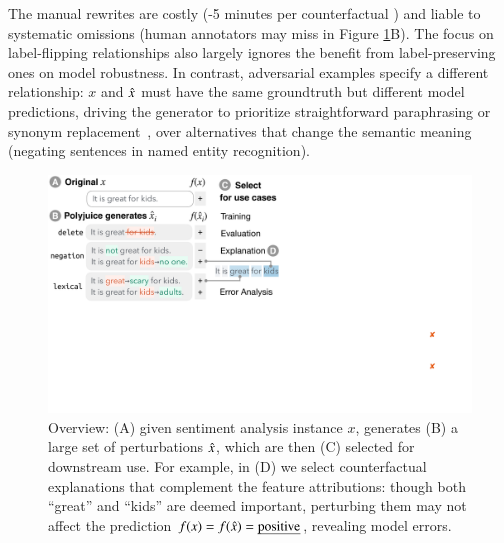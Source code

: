 The manual rewrites are costly (-5 minutes per counterfactual \cite{kaushik2019learning}) and liable to systematic omissions (\eg human annotators may miss  in Figure \ref{fig:teaser}B).
The focus on label-flipping relationships also largely ignores the benefit from label-preserving ones on model robustness.
In contrast, adversarial examples specify a different relationship: $x$ and $\hat{x}$ must have the same groundtruth but different model predictions, driving the generator to prioritize straightforward paraphrasing or synonym replacement~\cite{iyyer2018adversarial, ribeiro2018semantically}, over alternatives that change the semantic meaning (\eg negating sentences in named entity recognition).

\begin{figure}[t]
\centering
\includegraphics[trim={0 18cm 30.5cm 0cm},clip, width=1\columnwidth]{figures/teaser.pdf}
\vspace{-15pt}
\caption{
Overview: (A) given sentiment analysis instance $x$, \sysname generates (B) a large set of perturbations $\hat{x}$, which are then (C) selected for downstream use.
For example, in (D) we select counterfactual explanations that complement the feature attributions: though both ``great'' and ``kids'' are deemed important, perturbing them may not affect the prediction $f(x)=f(\hat{x})=\text{\emph{positive}}$, revealing model errors.\footnotemark
}
\vspace{-15pt}
\label{fig:teaser}
\end{figure} 


